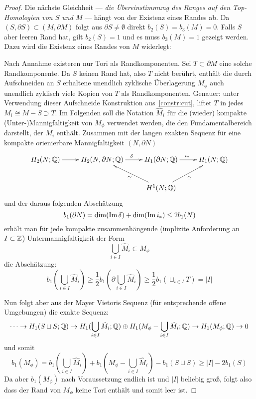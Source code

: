 \begin{proof}
	 Die nächste Gleichheit --- \emph{die Übereinstimmung des Ranges auf den Top-Homologien von $S$ und $M$} --- hängt von der Existenz eines Randes ab. Da $(S,\partial S) \subset (M,\partial M)$ folgt aus $\partial S \neq \emptyset$ direkt $b_2(S)=b_3(M)=0$. Falls $S$ aber leeren Rand hat, gilt $b_2(S)=1$ und es muss $b_3(M)=1$ gezeigt werden. Dazu wird die Existenz eines Randes von $M$ widerlegt:

	 Nach Annahme existeren nur Tori als Randkomponenten. Sei $T \subset \partial M$ eine solche Randkomponente. Da $S$ keinen Rand hat, also $T$ nicht berührt, enthält die durch Aufschneiden an $S$ erhaltene unendlich zyklische Überlagerung $M_\phi$ auch unendlich zyklisch viele Kopien von $T$ als Randkomponenten. Genauer: unter Verwendung dieser Aufschneide Konstruktion aus~\ref{constr:cut}, liftet $T$ in jedes $M_i \cong M - S \supset T$. Im Folgenden soll die Notation $\hat M_i$ für die (wieder) kompakte (Unter-)Mannigfaltigkeit von $M_\phi$ verwendet werden, die den Fundamentalbereich darstellt, der $M_i$ enthält. Zusammen mit der langen exakten Sequenz für eine kompakte orienierbare Mannigfaltigkeit $(N,\partial N)$
	\[
	 \begin{xy}
	 	\xymatrix{
	 	H_2(N;\QQ) \ar[r]&  H_2(N,\partial N ; \QQ) \ar[r]^\delta & H_1(\partial N;\QQ) \ar[r]^{i_*}& H_1(N;\QQ) \\
	 	& &H^1(N;\QQ) \ar[ru]_\cong \ar[lu]^\cong&}
	 \end{xy}
	 \] 
	 und der daraus folgenden Abschätzung
	 \[
	 	b_1(\partial N) = \dim(\operatorname{Im} \delta) + \dim(\operatorname{Im} i_*) \leq  2b_1(N)
	 \]
	 erhält man für jede kompakte zusammenhängende (implizite Anforderung an $I\subset \mathbb{Z}$) Untermannigfaltigkeit der Form 
	 \[
	  	\bigcup_{i\in I} \hat M_i \subset M_\phi 
	  \]
	  die Abschätzung:
	  \[
	   	b_1(\bigcup_{i\in I} \hat M_i)\geq \frac{1}{2}b_1(\partial \bigcup_{i\in I} \hat M_i) \geq \frac{1}{2}b_1(\sqcup_{i \in I}T) = |I|
	  \]


	  Nun folgt aber aus der Mayer Vietoris Sequenz (für entsprechende offene Umgebungen) die exakte Sequenz:
	  \[
	  	\cdots\to H_1(S\sqcup S;\mathbb{Q}) \to H_1(\bigcup_{i \in I} \hat M_i;\mathbb{Q}) \oplus H_1(M_\phi -\bigcup_{i \in I} \hat M_i;\mathbb{Q}) \to H_1(M_\phi;\mathbb{Q}) \to 0
	  \]
	  und somit
	  \[
	  	b_1(M_\phi)= b_1(\bigcup_{i \in I} \hat M_i)+b_1(M_\phi -\bigcup_{i \in I} \hat M_i)-b_1(S\sqcup S) \geq |I| -2b_1(S)
	  \]
	  Da aber $b_1(M_\phi)$ nach Voraussetzung endlich ist und $|I|$ beliebig groß, folgt also dass der Rand von $M_\phi$ keine Tori enthält und somit leer ist.


\end{proof}
